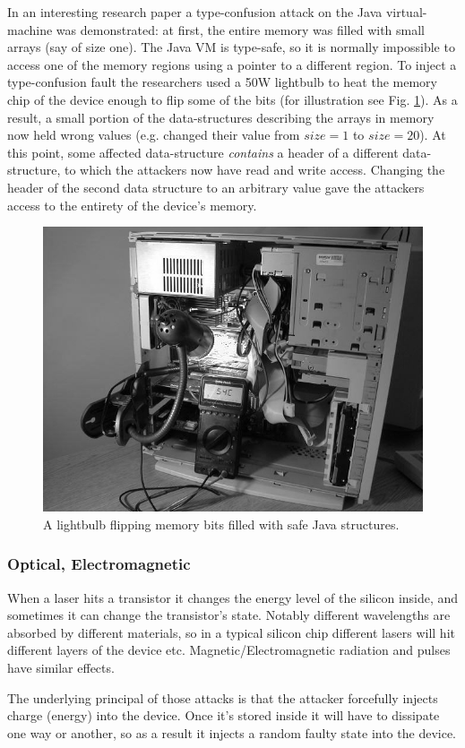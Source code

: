 In an interesting research paper \cite{bib:appel} a type-confusion attack on the Java virtual-machine was demonstrated: at first, the entire memory was filled with small arrays (say of size one). The Java VM is type-safe, so it is normally impossible to access one of the memory regions using a pointer to a different region. To inject a type-confusion fault the researchers used a 50W lightbulb to heat the memory chip of the device enough to flip some of the bits (for illustration see Fig. \ref{fig:memory_lightbulb}). As a result, a small portion of the data-structures describing the arrays in memory now held wrong values (e.g. changed their value from $size=1$ to $size=20$). At this point, some affected data-structure \emph{contains} a header of a different data-structure, to which the attackers now have read and write access. Changing the header of the second data structure to an arbitrary value gave the attackers access to the entirety of the device's memory.
\begin{figure}[!ht]
    \centering
	\includegraphics[width=0.7\linewidth]{images/ch9/bulb.png}
	\caption{A lightbulb flipping memory bits filled with safe Java structures.}
	\label{fig:memory_lightbulb}
\end{figure}

\subsubsection{Optical, Electromagnetic}
When a laser hits a transistor it changes the energy level of the silicon inside, and sometimes it can change the transistor's state. Notably different wavelengths are absorbed by different materials, so in a typical silicon chip different lasers will hit different layers of the device etc. Magnetic/Electromagnetic radiation and pulses have similar effects.

The underlying principal of those attacks is that the attacker forcefully injects charge (energy) into the device. Once it's stored inside it will have to dissipate one way or another, so as a result it injects a random faulty state into the device.

